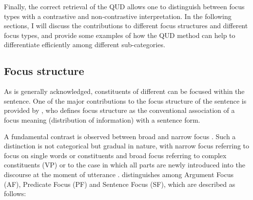 Finally, the correct retrieval of the QUD allows one to distinguish between focus types with a contrastive and non-contrastive interpretation. In the following sections, I will discuss the contributions to different focus structures and different focus types, and provide some examples of how the QUD method can help to differentiate efficiently among different sub-categories.

\subsection{Focus structure} \label{sub:2.1.1}
As is generally acknowledged, constituents of different  can be focused within the sentence. One of the major contributions to the focus structure of the sentence is provided by \textcite{lambrecht1996information}, who defines focus structure as the conventional association of a focus meaning (distribution of information) with a sentence form. 

A fundamental contrast is observed between broad and narrow focus \parencite{selkirk1984phonology, lambrecht1996information}. Such a distinction is not categorical but gradual in nature, with narrow focus referring to focus on single words or constituents and broad focus referring to complex constituents (VP) or to the case in which all parts are newly introduced into the discourse at the moment of utterance \parencite{fery2008information}.
\textcite[611]{lambrecht2000subjects} distinguishes among Argument Focus (AF), Predicate Focus (PF) and Sentence Focus (SF), which are described as follows:


